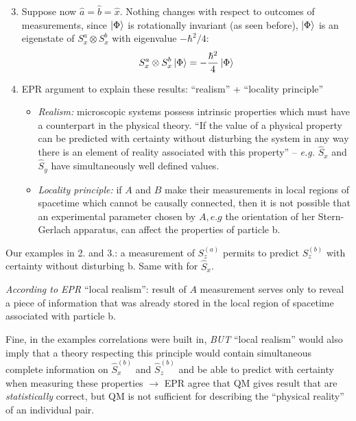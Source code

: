 \documentclass[12pt]{article}
\begin{document}
\begin{enumerate}
\setcounter{enumi}{2}
\item Suppose now \(\hat{a}=\hat{b}=\hat{x}\). Nothing changes with
respect to outcomes of measurements, since $\ket{\Phi}$ is
rotationally invariant (as seen before), $\ket{\Phi}$ is an
eigenstate of $S_{x}^{a} \otimes S_{x}^{b}$ with eigenvalue $-\hbar^2/4$:
\[
S_{x}^{a} \otimes S_{x}^{b}\ket{\Phi} = -\frac{\hbar^2}{4} \ket{\Phi}
\]

\item EPR argument to explain these results:
``realism'' + ``locality principle''
\begin{itemize}
\item\emph{Realism:} microscopic systems possess intrinsic
properties which must have a counterpart
in the physical theory.
``If the value of a physical property can be predicted
with certainty without disturbing the system in any
way there is an element of reality associated with
this property'' -- \textit{e.g.} $\hat{S}_x$ and $\hat{S}_y$ have simultaneously well defined values.
\item\emph{Locality principle:} if \(A\) and \(B\) make their measurements
in local regions of spacetime which cannot be
causally connected, then it is not possible that
an experimental parameter chosen by \(A, e . g\) the
orientation of her Stern-Gerlach apparatus, can affect
the properties of particle b.
\end{itemize}
\end{enumerate}

Our examples in 2. and 3.: a measurement of
\(S_{z}^{(a)}\) permits to predict \(S_{z}^{(b)}\) with certainty
without disturbing b. Same with for \(\hat{S}_{x}\).


\emph{According to EPR} ``local realism'': result of \(A\)
measurement serves only to reveal a piece of
information that was already stored in the local
region of spacetime associated with particle b.

Fine, in the examples correlations were built in, \emph{BUT}
``local realism'' would also imply that a theory
respecting this principle would contain simultaneous 
complete information on \(\hat{S}_{x}^{(b)}\) and \(\hat{S}_{z}^{(b)}\) and be
able to predict with certainty when measuring these
properties $\to$ EPR agree that QM gives result
that are \emph{statistically} correct, but
QM is not sufficient for describing
the ``physical reality'' of an individual
pair.
\end{document}
